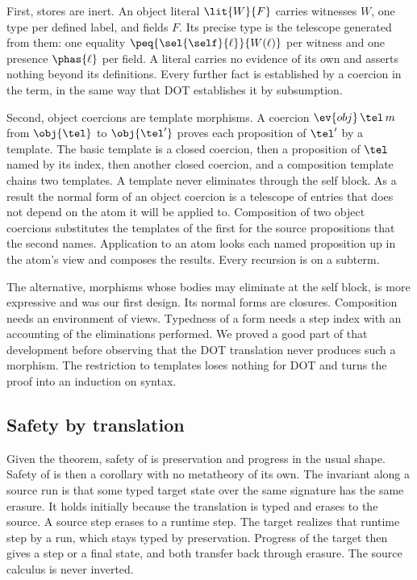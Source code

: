 First, stores are inert. An object literal $\lit{W}{F}$ carries witnesses $W$, one type per defined label, and fields $F$. Its precise type is the telescope generated from them: one equality $\peq{\sel{\self}{\ell}}{W(\ell)}$ per witness and one presence $\phas{\ell}$ per field. A literal carries no evidence of its own and asserts nothing beyond its definitions. Every further fact is established by a coercion in the term, in the same way that DOT establishes it by subsumption.

Second, object coercions are template morphisms. A coercion $\ev{obj}\,\tel\,m$ from $\obj{\tel}$ to $\obj{\tel'}$ proves each proposition of $\tel'$ by a template. The basic template is a closed coercion, then a proposition of $\tel$ named by its index, then another closed coercion, and a composition template chains two templates. A template never eliminates through the self block. As a result the normal form of an object coercion is a telescope of entries that does not depend on the atom it will be applied to. Composition of two object coercions substitutes the templates of the first for the source propositions that the second names. Application to an atom looks each named proposition up in the atom's view and composes the results. Every recursion is on a subterm.

The alternative, morphisms whose bodies may eliminate at the self block, is more expressive and was our first design. Its normal forms are closures. Composition needs an environment of views. Typedness of a form needs a step index with an accounting of the eliminations performed. We proved a good part of that development before observing that the DOT translation never produces such a morphism. The restriction to templates loses nothing for DOT and turns the proof into an induction on syntax.

\subsection{Safety by translation}

Given the theorem, safety of \FCdot is preservation and progress in the usual shape. Safety of \DOTMNF is then a corollary with no metatheory of its own. The invariant along a source run is that some typed target state over the same signature has the same erasure. It holds initially because the translation is typed and erases to the source. A source step erases to a runtime step. The target realizes that runtime step by a run, which stays typed by preservation. Progress of the target then gives a step or a final state, and both transfer back through erasure. The source calculus is never inverted.
